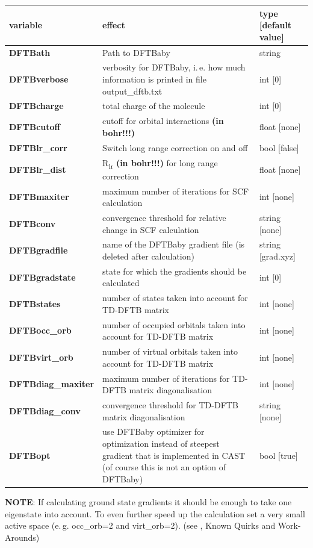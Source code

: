 \documentclass[10pt,a4paper]{article} %
\begin{document}
\begin{longtable}{|p{3.5cm}|p{5cm}|p{2.5cm}|}
	variable & effect & type [default value] \\
	\hline
	\textbf{DFTBath} & Path to DFTBaby & string \\
	\textbf{DFTBverbose} & verbosity for DFTBaby, i.\,e. how much information is printed in file output\_dftb.txt & int [0] \\	
	\textbf{DFTBcharge} & total charge of the molecule & int [0] \\
	\textbf{DFTBcutoff} & cutoff for orbital interactions \textbf{(in bohr!!!)} & float [none] \\
	\textbf{DFTBlr\_corr} & Switch long range correction on and off & bool [false] \\
	\textbf{DFTBlr\_dist} & R\textsubscript{lr} \textbf{(in bohr!!!)} for long range correction & float [none] \\
	\textbf{DFTBmaxiter} & maximum number of iterations for SCF calculation & int [none] \\
	\textbf{DFTBconv} & convergence threshold for relative change in SCF calculation & string [none] \\
	\textbf{DFTBgradfile} & name of the DFTBaby gradient file (is deleted after calculation) & string [grad.xyz] \\
	\textbf{DFTBgradstate} & state for which the gradients should be calculated & int [0] \\
	\textbf{DFTBstates} & number of states taken into account for TD-DFTB matrix & int [none] \\
	\textbf{DFTBocc\_orb} & number of occupied orbitals taken into account for TD-DFTB matrix & int [none] \\
	\textbf{DFTBvirt\_orb} & number of virtual orbitals taken into account for TD-DFTB matrix & int [none] \\
	\textbf{DFTBdiag\_maxiter} & maximum number of iterations for TD-DFTB matrix diagonalisation & int [none] \\
	\textbf{DFTBdiag\_conv} & convergence threshold for TD-DFTB matrix diagonalisation & string [none] \\
	\textbf{DFTBopt} & use DFTBaby optimizer for optimization instead of steepest gradient that is implemented in CAST (of course this is not an option of DFTBaby) & bool [true] \\
\end{longtable} 

\textbf{NOTE}: If calculating ground state gradients it should be enough to take one eigenstate into account. To even further speed up the calculation set a very small active space (e.\,g. occ\_orb=2 and virt\_orb=2). (see \cite{noauthor_dftbaby_nodate}, Known Quirks and Work-Arounds)
\end{document}
